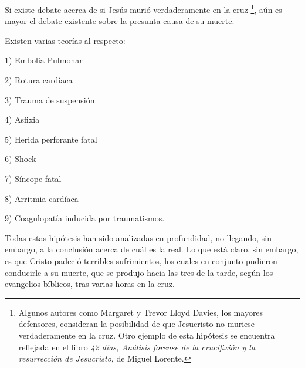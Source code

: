 Si existe debate acerca de si Jesús murió verdaderamente en la cruz \footnote{Algunos autores como Margaret y Trevor Lloyd Davies, los mayores defensores, consideran la posibilidad de que Jesucristo no muriese verdaderamente en la cruz. Otro ejemplo de esta hipótesis se encuentra reflejada en el libro \textit{42 días, Análisis forense de la crucifixión y la resurrección de Jesucristo}, de Miguel Lorente.}, aún es mayor el debate existente sobre la presunta causa de su muerte.

Existen varias teorías al respecto:

1) Embolia Pulmonar

2) Rotura cardíaca

3) Trauma de suspensión

4) Asfixia

5) Herida perforante fatal

6) Shock

7) Síncope fatal

8) Arritmia cardíaca

9) Coagulopatía inducida por traumatismos.

Todas estas hipótesis han sido analizadas en profundidad, no llegando, sin embargo, a la conclusión acerca de cuál es la real. Lo que está claro, sin embargo, es que Cristo padeció terribles sufrimientos, los cuales en conjunto pudieron conducirle a su muerte, que se produjo hacia las tres de la tarde, según los evangelios bíblicos, tras varias horas en la cruz.

